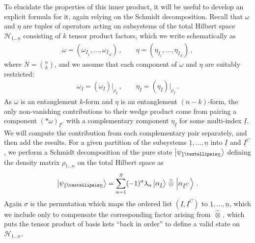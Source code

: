 \documentclass[12pt]{article}
\newcommand{\ul}[1]{{\underline{#1}}}
\newcommand{\wotimes}{ \, \widehat{\otimes} \, }
\numberwithin{equation}{section}
\newcommand{\Honeton}{{\mathcal{H}_{\ul{1} \ldots \ul{n}}}}
\newcommand{\rhooneton}{{\rho_{\ul{1} \ldots \ul{n}}}}
\newcommand{\psioneton}{{\psi_{\ul{1} \ldots \ul{n}}}}
\begin{document}
To elucidate the properties of this inner product, it will be useful to develop an explicit formula for it, again relying on the Schmidt decomposition. Recall that $\omega$ and $\eta$ are tuples of operators acting on subsystems of the total Hilbert space $\Honeton$ consisting of $k$ tensor product factors, which we write schematically as 
%
\begin{align}
    \omega = \left( \omega_{ \underline{I}_1 } , \ldots , \omega_{ \underline{I}_N } \right) \, , \qquad \eta = \left( \eta_{ \underline{I}_1 } , \ldots , \eta_{ \underline{I}_N } \right) \, ,
\end{align}
%
where $N = {n \choose k}$, and we assume that each component of $\omega$ and $\eta$ are suitably restricted:
%
\begin{align}
    \omega_{\ul{I}} = \left( \omega_{\ul{I}} \right) \big\vert_{\rho_{\ul{I}}} \, , \qquad \eta_{\ul{I}} = \left( \eta_{\ul{I}} \right) \big\vert_{\rho_{\ul{I}}} \, .
\end{align}
%
As $\omega$ is an entanglement $k$-form and $\eta$ is an entanglement $(n - k)$-form, the only non-vanishing contributions to their wedge product come from pairing a component $(\ast \omega)_{\ul{I}^C}$ with a complementary component $\eta_{\ul{I}}$ for some multi-index $\ul{I}$. We will compute the contribution from each complementary pair separately, and then add the results. For a given partition of the subsystems $\ul{1} , \ldots , \ul{n}$ into $\ul{I}$ and $\ul{I}^C$, we perform a Schmidt decomposition of the pure state $\ket{\psioneton}$ defining the density matrix $\rhooneton$ on the total Hilbert space as
%
\begin{align}
    \ket{\psioneton} = \sum_{\alpha = 1}^{S} ( - 1 )^\sigma \lambda_\alpha \ket{\alpha_{\ul{I}}} \wotimes \ket{\alpha_{\ul{I}^C}} \, .
\end{align}
%
Again $\sigma$ is the permutation which maps the ordered list $(\ul{I} , \ul{I}^C)$ to $\ul{1} , \ldots , \ul{n}$, which we include only to compensate the corresponding factor arising from $\wotimes$, which puts the tensor product of basis kets ``back in order'' to define a valid state on $\Honeton$.
\end{document}
